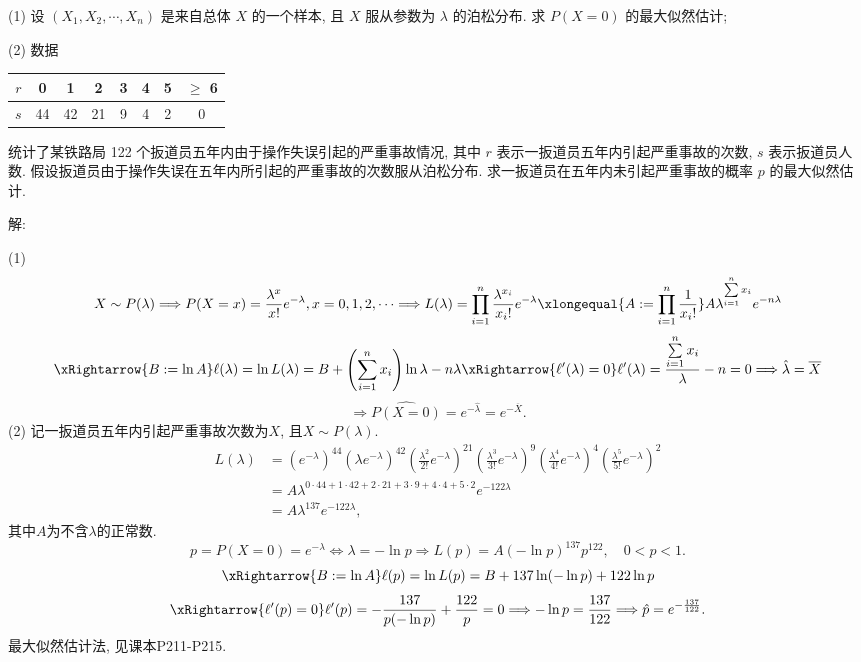 \documentclass[standard]{ExBook}
\renewenvironment{shaded}{%
  \def\FrameCommand{\fboxsep=\FrameSep \colorbox{shadecolor}}%
  \MakeFramed{\advance\hsize-\width \FrameRestore}%
}{%
  \endMakeFramed
}
\begin{document}
\begin{qitems}
\begin{bbox}
\begin{shaded}
(1) 设 \( (X_1, X_2, \cdots, X_n) \) 是来自总体 \( X \) 的一个样本, 且 \( X \) 服从参数为 \( \lambda \) 的泊松分布. 求 \( P(X = 0) \) 的最大似然估计;

(2) 数据
\begin{center}
\setlength{\tabcolsep}{24pt}
\begin{tabular}{c|ccccccc}
\hline  
\( r \) & 0 & 1 & 2 & 3 & 4 & 5 & \(\geq\) 6 \\
\hline
\( s \) & 44 & 42 & 21 & 9 & 4 & 2 & 0 \\
\hline
\end{tabular}
\end{center}

统计了某铁路局 122 个扳道员五年内由于操作失误引起的严重事故情况, 其中 \( r \) 表示一扳道员五年内引起严重事故的次数, \( s \) 表示扳道员人数. 假设扳道员由于操作失误在五年内所引起的严重事故的次数服从泊松分布. 求一扳道员在五年内未引起严重事故的概率 \( p \) 的最大似然估计.
    \end{shaded}
    \end{bbox}

\vspace{\dimexpr2.5cm-5em\relax}

解:

(1) 
$$
X\sim P(\lambda)
\Longrightarrow
P(X=x)
=\frac{\lambda^x}{x!}e^{-\lambda}, x=0,1,2,\cdots
\Longrightarrow
L(\lambda)
=\prod_{i=1}^{n}\frac{\lambda^{x_i}}{x_i!}e^{-\lambda}
\xlongequal{A:=\prod\limits_{i=1}^{n}\frac{1}{x_i!}}
A\lambda^{\sum\limits_{i=1}^{n}x_i}e^{-n\lambda}
$$
$$
\xRightarrow{B:=\ln A}
\ell(\lambda)=\ln L(\lambda)
=B+\left(\sum_{i=1}^{n}x_i\right)\ln\lambda-n\lambda
\xRightarrow{\ell'(\lambda)=0}
\ell'(\lambda)=\frac{\sum\limits_{i=1}^{n}x_i}{\lambda}-n=0
\Longrightarrow
\hat{\lambda}=\overline{X}
$$
$$
\Longrightarrow
\widehat{P(X=0)}=e^{-\hat{\lambda}}=e^{-\overline{X}}.
$$
(2) 记一扳道员五年内引起严重事故次数为$X$, 且$X\sim P(\lambda)$.
$$
\begin{aligned}
L(\lambda)
&=\left(e^{-\lambda}\right)^{44}
\left(\lambda e^{-\lambda}\right)^{42}
\left(\frac{\lambda^2}{2!}e^{-\lambda}\right)^{21}
\left(\frac{\lambda^3}{3!}e^{-\lambda}\right)^9
\left(\frac{\lambda^4}{4!}e^{-\lambda}\right)^4
\left(\frac{\lambda^5}{5!}e^{-\lambda}\right)^2\\
&=A\lambda^{0\cdot44+1\cdot42+2\cdot21+3\cdot9+4\cdot4+5\cdot2}e^{-122\lambda}\\
&=A\lambda^{137}e^{-122\lambda},
\end{aligned}
$$
其中$A$为不含$\lambda$的正常数.
$$
p=P(X=0)=e^{-\lambda}
\Longleftrightarrow
\lambda=-\ln p
\Longrightarrow
L(p)=A(-\ln p)^{137}p^{122},\quad 0<p<1.
$$
$$
\xRightarrow{B:=\ln A}
\ell(p)=\ln L(p)
=B+137\ln(-\ln p)+122\ln p
$$
$$
\xRightarrow{\ell'(p)=0}
\ell'(p)
=-\frac{137}{p(-\ln p)}+\frac{122}{p}
=0
\Longrightarrow
-\ln p=\frac{137}{122}
\Longrightarrow
\hat{p}=e^{-\frac{137}{122}}.
$$
\textcolor{themeColor}{\selectfont {} 最大似然估计法, 见课本P211-P215.}


\end{qitems}
\end{document}
